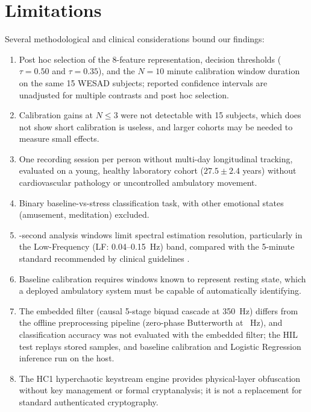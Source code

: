 \documentclass[conference]{IEEEtran}
\begin{document}
\section{Limitations}
\label{sec:limitations}
Several methodological and clinical considerations bound our findings:
\begin{enumerate}
    \item Post hoc selection of the 8-feature representation, decision thresholds ($\tau=0.50$ and $\tau=0.35$), and the $N=10$ minute calibration window duration on the same 15 WESAD subjects; reported confidence intervals are unadjusted for multiple contrasts and post hoc selection.
    \item Calibration gains at $N \le 3$ were not detectable with 15 subjects, which does not show short calibration is useless, and larger cohorts may be needed to measure small effects.
    \item One recording session per person without multi-day longitudinal tracking, evaluated on a young, healthy laboratory cohort ($27.5 \pm 2.4$ years) without cardiovascular pathology or uncontrolled ambulatory movement.
    \item Binary baseline-vs-stress classification task, with other emotional states (amusement, meditation) excluded.
    \item \valWindowDurationSec-second analysis windows limit spectral estimation resolution, particularly in the Low-Frequency (LF: 0.04--0.15~Hz) band, compared with the 5-minute standard recommended by clinical guidelines \cite{taskforce1996hrv}.
    \item Baseline calibration requires windows known to represent resting state, which a deployed ambulatory system must be capable of automatically identifying.
    \item The embedded filter (causal 5-stage biquad cascade at 350~Hz) differs from the offline preprocessing pipeline (zero-phase Butterworth at \valSamplingRateHz~Hz), and classification accuracy was not evaluated with the embedded filter; the HIL test replays stored samples, and baseline calibration and Logistic Regression inference run on the host.
    \item The HC1 hyperchaotic keystream engine provides physical-layer obfuscation without key management or formal cryptanalysis; it is not a replacement for standard authenticated cryptography.
\end{enumerate}
\end{document}

